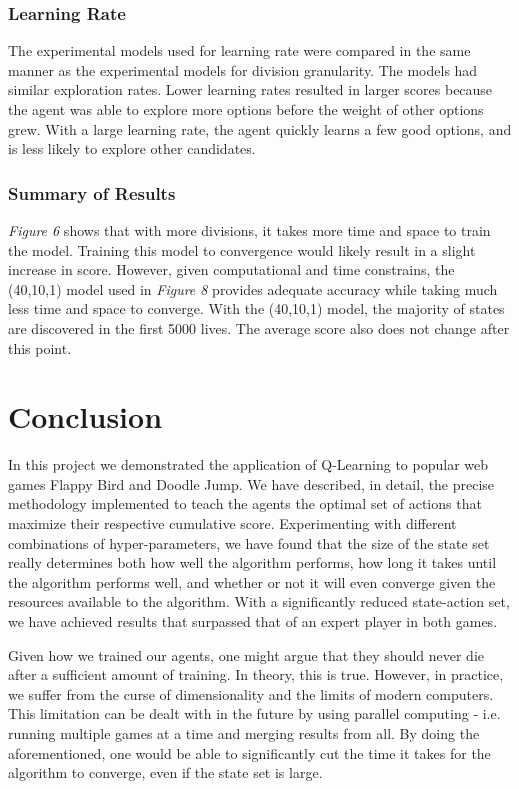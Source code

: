 \documentclass[a4paper, 12pt]{article}
\begin{document}
\subsubsection{Learning Rate}
	The experimental models used for learning rate were compared in the same manner as the experimental models for division granularity. The models had similar exploration rates. Lower learning rates resulted in larger scores because the agent was able to explore more options before the weight of other options grew. With a large learning rate, the agent quickly learns a few good options, and is less likely to explore other candidates.
\subsubsection{Summary of Results}
	\textit{Figure 6} shows that with more divisions, it takes more time and space to train the model. Training this model to convergence would likely result in a slight increase in score. However, given computational and time constrains, the (40,10,1) model used in \textit{Figure 8} provides adequate accuracy while taking much less time and space to converge. With the (40,10,1) model, the majority of states are discovered in the first 5000 lives. The average score also does not change after this point.

\section{Conclusion}

In this project we demonstrated the application of Q-Learning to popular web games Flappy Bird and Doodle Jump. We have described, in detail, the precise methodology implemented to teach the agents the optimal set of actions that maximize their respective cumulative score. Experimenting with different combinations of hyper-parameters, we have found that the size of the state set really determines both how well the algorithm performs, how long it takes until the algorithm performs well, and whether or not it will even converge given the resources available to the algorithm. With a significantly reduced state-action set, we have achieved results that surpassed that of an expert player in both games.

Given how we trained our agents, one might argue that they should never die after a sufficient amount of training. In theory, this is true. However, in practice, we suffer from the curse of dimensionality and the limits of modern computers. This limitation can be dealt with in the future by using parallel computing - i.e. running multiple games at a time and merging results from all. By doing the aforementioned, one would be able to significantly cut the time it takes for the algorithm to converge, even if the state set is large.
\end{document}
